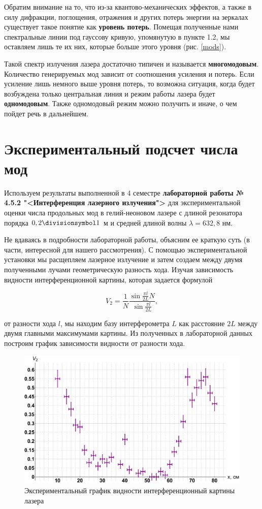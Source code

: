 \documentclass[12pt]{kiarticle}
\begin{document}
Обратим внимание на то, что из-за квантово-механических эффектов, а также в силу дифракции, поглощения, отражения и других потерь энергии на зеркалах существует такое понятие как \textbf{уровень потерь}. Помещая полученные нами спектральные линии под гауссову кривую, упомянутую в пункте 1.2, мы оставляем лишь те их них, которые больше этого уровня (рис. \ref{mods}).


Такой спектр излучения лазера достаточно типичен и называется \textbf{многомодовым}. Количество генерируемых мод
зависит от соотношения усиления и потерь. Если усиление лишь немного выше уровня потерь, то возможна ситуация, когда будет возбуждена
только центральная линия и режим работы лазера будет \textbf{одномодовым}. Также одномодовый режим можно получить и иначе, о чем пойдет речь в дальнейшем.

\section{Экспериментальный подсчет числа мод}

Используем результаты выполненной в 4 семестре \textbf{лабораторной работы № 4.5.2 "<Интерференция лазерного излучения">} для экспериментальной оценки числа продольных мод в гелий-неоновом лазере с длиной резонатора порядка $ 0,2 \divisionsymbol 1 $ м и средней длиной волны $ \lambda = 632,8 $ нм. 

Не вдаваясь в подробности лабораторной работы, объясним ее краткую суть (в части, интересной для нашего рассмотрения). С помощью экспериментальной установки мы расщепляем лазерное излучение и затем создаем между двумя полученными лучами геометрическую разность хода. Изучая зависимость видности интерференционной картины, которая задается формулой

\begin{equation}\label{V_2}
V_2 = \dfrac{1}{N} \dfrac{\sin {\frac{\pi l}{2L}N}}{\sin {\frac{\pi l}{2L}}},
\end{equation}

от разности хода $ l $, мы находим базу интерферометра $ L $ как расстояние $ 2L $ между двумя главными максимумами картины.  Из полученных в лабораторной данных построим график зависимости видности от разности хода.

\begin{figure}[h!]
	\centering
	\includegraphics[width=\linewidth]{452.pdf}
	\caption{Экспериментальный график видности интерференционный картины лазера}
	\label{V2}
\end{figure}
\end{document}
